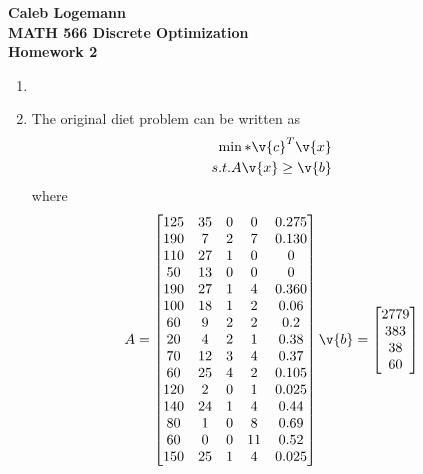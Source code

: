 \documentclass[11pt, oneside]{article}
\begin{document}
\noindent \textbf{\Large{Caleb Logemann \\
MATH 566 Discrete Optimization\\
Homework 2
}}

%
\begin{enumerate}
    \item %

    \item %

        The original diet problem can be written as
        \begin{align*}
            \min* \v{c}^T \v{x} \\
            s.t. A\v{x} \ge \v{b}
        \end{align*}
        where
        \begin{align*}
            A =
            \begin{bmatrix}
                125 & 35 & 0 &  0 & 0.275 \\ %
                190 &  7 & 2 &  7 & 0.130 \\ %
                110 & 27 & 1 &  0 &     0 \\ %
                 50 & 13 & 0 &  0 &     0 \\ %
                190 & 27 & 1 &  4 & 0.360 \\ %
                100 & 18 & 1 &  2 &  0.06 \\ %
                 60 &  9 & 2 &  2 &   0.2 \\ %
                 20 &  4 & 2 &  1 &  0.38 \\ %
                 70 & 12 & 3 &  4 &  0.37 \\ %
                 60 & 25 & 4 &  2 & 0.105 \\ %
                120 &  2 & 0 &  1 & 0.025 \\ %
                140 & 24 & 1 &  4 &  0.44 \\ %
                 80 &  1 & 0 &  8 &  0.69 \\ %
                 60 &  0 & 0 & 11 &  0.52 \\ %
                150 & 25 & 1 &  4 & 0.025    %
            \end{bmatrix}
            \v{b} =
            \begin{bmatrix}
                2779 \\
                 383 \\
                  38 \\
                  60 \\

\end{bmatrix}
\end{align*}
\end{enumerate}
\end{document}
